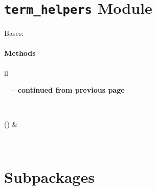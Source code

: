 \documentclass[letterpaper,10pt,english]{sphinxmanual}
\begin{document}
\section{\texttt{term\_helpers} Module}
\label{qikify:term-helpers-module}\label{qikify:module-qikify.term_helpers}

\begin{fulllineitems}
\label{qikify:qikify.term_helpers.colors}
Bases: 
\paragraph{Methods}

\begin{longtable}{ll}
\hline
\endfirsthead

%
{{\bfseries \tablename\ \thetable{} -- continued from previous page}} \\
\hline
\endhead

\hline {} \\ \hline
\endfoot

\hline
\endlastfoot


{\hyperref[qikify:qikify.term_helpers.colors.disable]{}}()
 & 

\\\hline
\end{longtable}


\begin{fulllineitems}
\label{qikify:qikify.term_helpers.colors.disable}
\end{fulllineitems}


\end{fulllineitems}


\begin{fulllineitems}
\label{qikify:qikify.term_helpers.outputPassFail}
\end{fulllineitems}



\section{Subpackages}
\label{qikify:subpackages}
\end{document}

